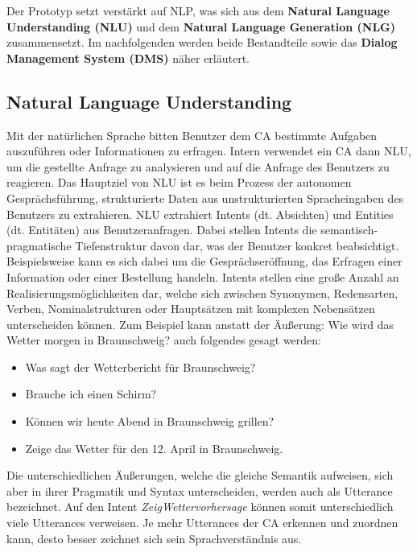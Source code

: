         Der Prototyp setzt verstärkt auf NLP, was sich aus dem \textbf{Natural Language Understanding (NLU)} und dem \textbf{Natural Language Generation (NLG)} zusammensetzt.
        Im nachfolgenden werden beide Bestandteile sowie das \textbf{Dialog Management System (DMS)} näher erläutert.
        \subsection{Natural Language Understanding} \label{NLU}
        Mit der natürlichen Sprache bitten Benutzer dem CA bestimmte Aufgaben auszuführen oder Informationen zu erfragen. 
        Intern verwendet ein CA dann NLU, um die gestellte Anfrage zu analysieren und auf die Anfrage des Benutzers zu reagieren.
        Das Hauptziel von NLU ist es beim Prozess der autonomen Gesprächsführung, strukturierte Daten aus unstrukturierten Spracheingaben des 
        Benutzers zu extrahieren. \parencite[2]{Ahmad.2021}\parencite[44]{Sieber.2019}
        NLU extrahiert Intents (dt. Absichten) und Entities (dt. Entitäten) aus Benutzeranfragen. Dabei stellen Intents 
        die semantisch-pragmatische Tiefenstruktur davon dar, was der Benutzer konkret beabsichtigt. Beispielsweise kann es sich dabei um die 
        Gesprächseröffnung, das Erfragen einer Information oder einer Bestellung handeln. Intents stellen eine große Anzahl an Realisierungsmöglichkeiten dar, welche
        sich zwischen Synonymen, Redensarten, Verben, Nominalstrukturen oder Hauptsätzen mit komplexen Nebensätzen unterscheiden können.
        Zum Beispiel kann anstatt der Äußerung: \glqq Wie wird das Wetter morgen in Braunschweig?\grqq{} auch folgendes gesagt werden: 
        \begin{itemize}
            \item \glqq Was sagt der Wetterbericht für Braunschweig?\grqq{}
            \item \glqq Brauche ich einen Schirm?\grqq{}
            \item \glqq Können wir heute Abend in Braunschweig grillen?\grqq{}
            \item \glqq Zeige das Wetter für den 12. April in Braunschweig.\grqq{}
        \end{itemize}
        Die unterschiedlichen Äußerungen, welche die gleiche Semantik aufweisen, sich aber in ihrer Pragmatik und Syntax unterscheiden, werden auch als \glqq Utterance\grqq{} bezeichnet.
        Auf den Intent \textit{ZeigWettervorhersage} können somit unterschiedlich viele
        Utterances verweisen. Je mehr Utterances der CA erkennen und zuordnen kann, desto besser zeichnet sich sein Sprachverständnis aus. 
